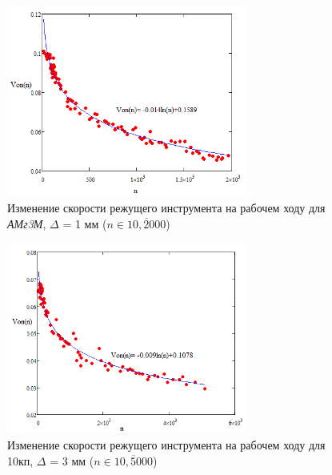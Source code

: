 \documentclass[11pt,twoside,openany]{report}
\begin{document}
\begin{figure}
  \begin{center}
  \includegraphics[width=0.7\textwidth]{amg3m.png}
  \caption{
    Изменение скорости режущего инструмента
    на рабочем ходу для
    {\it АМг3М}, $\Delta$ = 1 мм
    ($n \in \overline{10,2000}$)
  }
  \label{amg3m}
  \end{center}
\end{figure}

\begin{figure}
  \begin{center}
  \includegraphics[width=0.7\textwidth]{10kp.png}
  \caption{
    Изменение скорости режущего инструмента
    на рабочем ходу для 10кп, $\Delta$ = 3 мм
    ($n \in \overline{10,5000}$)
  }
  \label{10kp}
  \end{center}
\end{figure}
\end{document}
